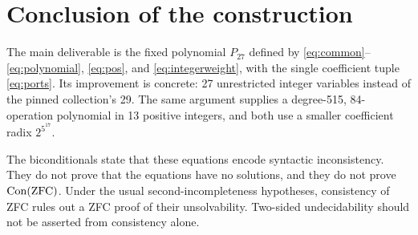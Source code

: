 \documentclass[11pt]{article}
\theoremstyle{definition}\newtheorem{definition}[theorem]{Definition}
\theoremstyle{remark}\newtheorem{remark}[theorem]{Remark}
\begin{document}
\section{Conclusion of the construction}
The main deliverable is the fixed polynomial $P_{27}$ defined by \eqref{eq:common}--\eqref{eq:polynomial}, \eqref{eq:pos}, and \eqref{eq:integerweight}, with the single coefficient tuple \eqref{eq:ports}. Its improvement is concrete: 27 unrestricted integer variables instead of the pinned collection's 29. The same argument supplies a degree-515, 84-operation polynomial in 13 positive integers, and both use a smaller coefficient radix $2^{5^{17}}$.

The biconditionals state that these equations encode syntactic inconsistency. They do not prove that the equations have no solutions, and they do not prove $\operatorname{Con}(\mathrm{ZFC})$. Under the usual second-incompleteness hypotheses, consistency of ZFC rules out a ZFC proof of their unsolvability. Two-sided undecidability should not be asserted from consistency alone.
\end{document}
